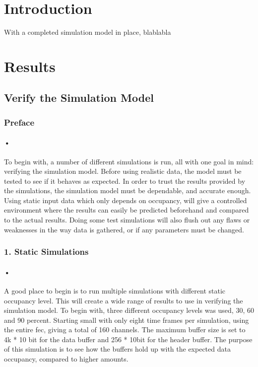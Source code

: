 \documentclass[a4paper, 12pt]{report}
\begin{document}
\section{Introduction}
With a completed simulation model in place, blablabla

\section{Results}

\subsection{Verify the Simulation Model}

\subsubsection{Preface}

\paragraph{•}
To begin with, a number of different simulations is run, all with one goal in mind: verifying the simulation model.
Before using realistic data, the model must be tested to see if it behaves as expected.
In order to trust the results provided by the simulations, the simulation model must be dependable, and accurate enough.
Using static input data which only depends on occupancy, will give a controlled environment where the results can easily be predicted beforehand and compared to the actual results.
Doing some test simulations will also flush out any flaws or weaknesses in the way data is gathered, or if any parameters must be changed.

\subsubsection{1. Static Simulations}
\paragraph{•}
A good place to begin is to run multiple simulations with different static occupancy level.
This will create a wide range of results to use in verifying the simulation model.
To begin with, three different occupancy levels was used, 30, 60 and 90 percent.
Starting small with only eight time frames per simulation, using the entire \gls{fec}, giving a total of 160 channels.
The maximum buffer size is set to 4k * 10 bit for the data buffer and 256 * 10bit for the header buffer.
The purpose of this simulation is to see how the buffers hold up with the expected data occupancy, compared to higher amounts.
\end{document}
